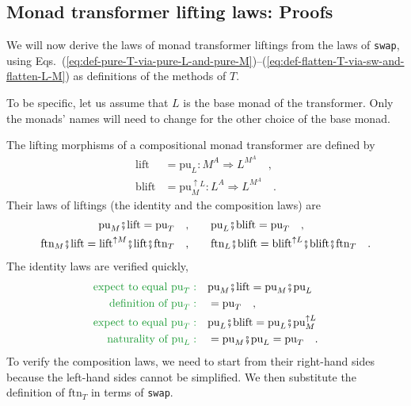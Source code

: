 \subsection{Monad transformer lifting laws: Proofs}

We will now derive the laws of monad transformer liftings from the
laws of \lstinline!swap!,
using Eqs.~(\ref{eq:def-pure-T-via-pure-L-and-pure-M})–(\ref{eq:def-flatten-T-via-sw-and-flatten-L-M})
as definitions of the methods of $T$.

To be specific, let us assume that $L$ is the base monad of the transformer.
Only the monads' names will need to change for the other choice of
the base monad.

The lifting morphisms of a compositional monad transformer are defined
by
\begin{align*}
\text{lift} & =\text{pu}_{L}:M^{A}\Rightarrow L^{M^{A}}\quad,\\
\text{blift} & =\text{pu}_{M}^{\uparrow L}:L^{A}\Rightarrow L^{M^{A}}\quad.
\end{align*}
Their laws of liftings (the identity and the composition laws) are
\begin{align*}
\text{pu}_{M}\bef\text{lift}=\text{pu}_{T}\quad,\quad & \quad\text{pu}_{L}\bef\text{blift}=\text{pu}_{T}\quad,\\
\text{ftn}_{M}\bef\text{lift}=\text{lift}^{\uparrow M}\bef\text{lift}\bef\text{ftn}_{T}\quad,\quad & \quad\text{ftn}_{L}\bef\text{blift}=\text{blift}^{\uparrow L}\bef\text{blift}\bef\text{ftn}_{T}\quad.
\end{align*}
The identity laws are verified quickly,
\begin{align*}
{\color{greenunder}\text{expect to equal }\text{pu}_{T}:}\quad & \text{pu}_{M}\bef\text{lift}=\text{pu}_{M}\bef\text{pu}_{L}\\
{\color{greenunder}\text{definition of }\text{pu}_{T}:}\quad & =\text{pu}_{T}\quad,\\
{\color{greenunder}\text{expect to equal }\text{pu}_{T}:}\quad & \text{pu}_{L}\bef\text{blift}=\text{pu}_{L}\bef\text{pu}_{M}^{\uparrow L}\\
{\color{greenunder}\text{naturality of }\text{pu}_{L}:}\quad & =\text{pu}_{M}\bef\text{pu}_{L}=\text{pu}_{T}\quad.
\end{align*}
To verify the composition laws, we need to start from their right-hand
sides because the left-hand sides cannot be simplified. We then substitute
the definition of $\text{ftn}_{T}$ in terms of \lstinline!swap!.
